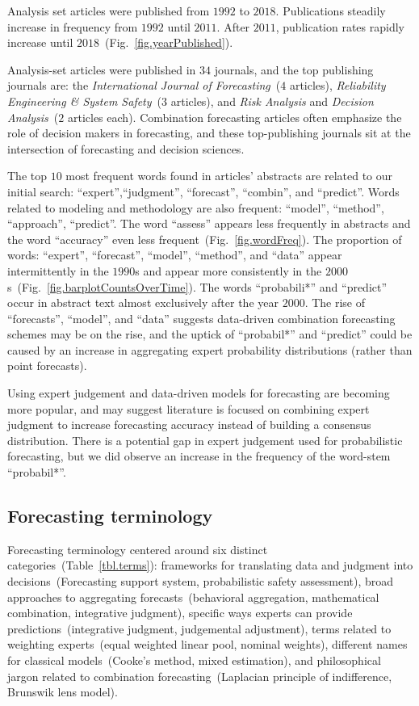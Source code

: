 \documentclass[preprint,authoryear]{elsarticle}
\begin{document}
Analysis set articles were published from $1992$ to $2018$.
Publications steadily increase in frequency from $1992$ until $2011$.
After $2011$, publication rates rapidly increase until $2018$~(Fig.~\ref{fig.yearPublished}).

Analysis-set articles were published in $34$ journals, and the top publishing journals are: the \textit{International Journal of Forecasting}~($4$ articles), \textit{Reliability Engineering \& System Safety}~($3$ articles), and \textit{Risk Analysis} and \textit{Decision Analysis}~($2$ articles each).
Combination forecasting articles often emphasize the role of decision makers in forecasting, and
these top-publishing journals sit at the intersection of forecasting and decision sciences.

The top $10$ most frequent words found in articles' abstracts are related to our initial search: ``expert'',``judgment'', ``forecast'', ``combin'', and ``predict''.
Words related to modeling and methodology are also frequent: ``model'', ``method'', ``approach'', ``predict''.
The word ``assess'' appears less frequently in abstracts and the word ``accuracy'' even less frequent~(Fig.~\ref{fig.wordFreq}).
%
The proportion of words: ``expert'', ``forecast'', ``model'', ``method'', and ``data'' appear intermittently in the $1990$s and appear more consistently in the $2000$s~(Fig.~\ref{fig.barplotCountsOverTime}).
The words ``probabili*'' and ``predict'' occur in abstract text almost exclusively after the year $2000$.
The rise of ``forecasts'', ``model'', and ``data'' suggests data-driven combination forecasting schemes may be on the rise, and the uptick of ``probabil*'' and ``predict'' could be caused by an increase in aggregating expert probability distributions (rather than point forecasts).

Using expert judgement and data-driven models for forecasting are becoming more popular, and may suggest literature is focused on combining expert judgment to increase forecasting accuracy instead of building a consensus distribution.
There is a potential gap in expert judgement used for probabilistic forecasting, but we did observe an increase in the frequency of the word-stem ``probabil*''.

\subsection{Forecasting terminology}

Forecasting terminology centered around six distinct categories~(Table~\ref{tbl.terms}): frameworks for translating data and judgment into decisions~(Forecasting support system, probabilistic safety assessment), broad approaches to aggregating forecasts~(behavioral aggregation, mathematical combination, integrative judgment), specific ways experts can provide predictions~(integrative judgment, judgemental adjustment), terms related to weighting experts~(equal weighted linear pool, nominal weights), different names for classical models~(Cooke's method, mixed estimation), and philosophical jargon related to combination forecasting~(Laplacian principle of indifference, Brunswik lens model). 
\end{document}
